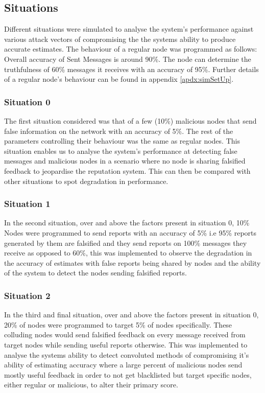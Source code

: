 \documentclass[journal]{IEEEtran}
\begin{document}
\subsection{Situations}
\label{sec:Experiments:sit}
Different situations were simulated to analyse the system's performance against various attack vectors of compromising the the systems ability to produce accurate estimates. The behaviour of a regular node was programmed as follows: Overall accuracy of Sent Messages is around 90\%. The node can determine the truthfulness of 60\% messages it receives with an accuracy of 95\%. %
Further details of a regular node's behaviour can be  found in appendix \ref{apdx:simSetUp}.
\subsubsection{Situation 0}
\label{sec:Experiments:sit:0}
The first situation considered was that of a few (10\%) malicious nodes that send false information on the network with an accuracy of 5\%. The rest of the parameters controlling their behaviour was the same as regular nodes. This situation enables us to analyse the system's performance at detecting false messages and malicious nodes in a scenario where no node is sharing falsified feedback to jeopardise the reputation system. This can then be compared with other situations to spot degradation in performance.
\subsubsection{Situation 1}
\label{sec:Experiments:sit1}
In the second situation, over and above the factors present in situation 0, 10\% Nodes were programmed to send reports with an accuracy of 5\% i.e 95\% reports generated by them are falsified and they send reports on 100\% messages they receive as opposed to 60\%, this was implemented to observe the degradation in the accuracy of estimates with false reports being shared by nodes and the ability of the system to detect the nodes sending falsified reports.
\subsubsection{Situation 2}
\label{sec:Experiments:sit2}
In the third and final situation, over and above the factors present in situation 0, 20\% of nodes were programmed to target 5\% of nodes specifically. These colluding nodes would send falsified feedback on every message received from target nodes while sending useful reports otherwise. This was implemented to analyse the systems ability to detect convoluted methods of compromising it's ability of estimating accuracy where a large percent of malicious nodes send mostly useful feedback in order to not get blacklisted but target specific nodes, either regular or malicious, to alter their primary score.
\end{document}

